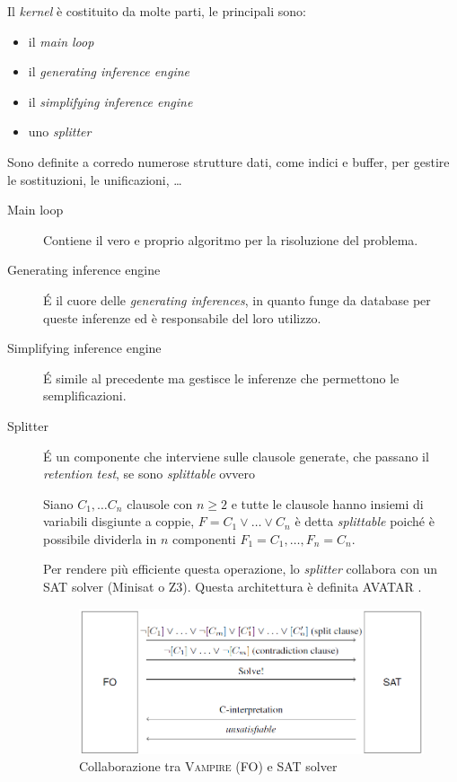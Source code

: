 Il \emph{kernel} è costituito da molte parti, le principali sono:
\begin{itemize}
    \item il \emph{main loop}
    \item il \emph{generating inference engine}
    \item il \emph{simplifying inference engine}
    \item uno \emph{splitter}
\end{itemize}
Sono definite a corredo numerose strutture dati, come indici e buffer, per gestire le sostituzioni, le unificazioni, \dots
\begin{description}
    \item[Main loop] Contiene il vero e proprio algoritmo per la risoluzione del problema.
    \item[Generating inference engine] \'E il cuore delle \emph{generating inferences}, in quanto funge da database per queste inferenze ed è responsabile del 
    loro utilizzo.
    \item[Simplifying inference engine] \'E simile al precedente ma gestisce le inferenze che permettono le semplificazioni.
    \item[Splitter] \'E un componente che interviene sulle clausole generate, che passano il \emph{retention test}, se sono \emph{splittable} ovvero
    \begin{definition}
        Siano $C_1,\dots C_n$ clausole con $n\geq 2$ e tutte le clausole hanno insiemi di variabili disgiunte a coppie, 
        $F=C_1 \lor \dots \lor C_n$ è detta \emph{splittable} poiché è possibile dividerla in $n$ componenti $F_1=C_1, \dots, F_n=C_n$.
    \end{definition}
    Per rendere più efficiente questa operazione, lo \emph{splitter} collabora con un SAT solver (Minisat o Z3). Questa architettura è definita AVATAR \cite{voronkov2014avatar}. 
    \begin{figure}[H]
        \centering
        \includegraphics[width=\columnwidth]{figures/avatar.png}
        \caption{Collaborazione tra \textsc{Vampire} (FO) e SAT solver \cite{voronkov2014avatar}}
    \end{figure}
\end{description}

